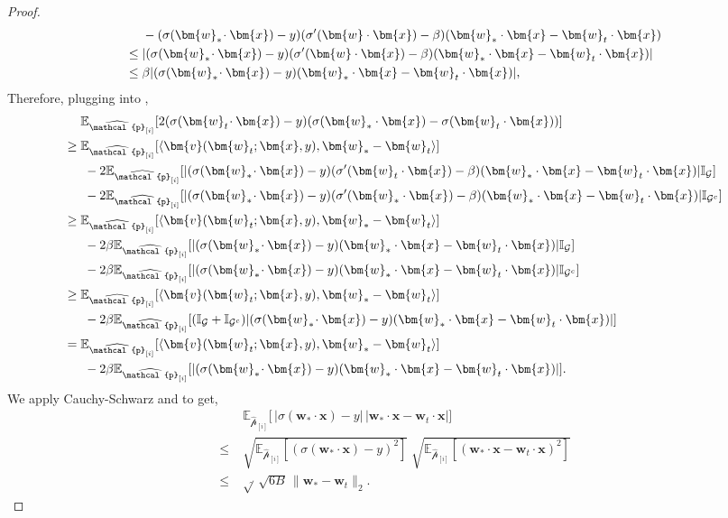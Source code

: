 \documentclass[11pt]{article}
\numberwithin{thm}{section}
\theoremstyle{plain}
\theoremstyle{definition}
\theoremstyle{remark} \newtheorem{remark}[thm]{Remark}
\def\vv{{\bm{v}}}
\def\vw{{\bm{w}}}
\def\vx{{\bm{x}}}
\def\ep{\widehat{\mathcal{p}}}
\def\cG{{\mathcal{G}}}
\newcommand{\E}{\mathbb{E}}
\newcommand{\Ind}{\mathbb{I}}
\newcommand{\innp}[1]{\langle #1 \rangle}
\DeclarePairedDelimiter\abs{|}{|}
\newcommand{\epi}{\ep_{[i]}}
\DeclareMathOperator{\mOPT}{OPT_m}
\newcommand{\mOPThat}{\widehat{\mOPT}}
\begin{document}
\begin{proof}
	\begin{align}\label{eq:bounding-two-terms}
		&-(\sigma(\vw_*\!\cdot\vx)-y)(\sigma'(\vw\cdot \vx)-\beta)(\vw_*\cdot \vx-\vw_t\cdot \vx) \notag \\
		\le\; & |(\sigma(\vw_*\!\cdot\vx)-y)(\sigma'(\vw\cdot \vx)-\beta)(\vw_*\cdot \vx-\vw_t\cdot \vx)| \notag \\
		\le \; & \beta|(\sigma(\vw_*\!\cdot\vx)-y)(\vw_*\cdot \vx-\vw_t\cdot \vx)|,
	\end{align}
	Therefore, plugging  into ,
	\begin{align*}
		& \E_{\epi}[2(\sigma(\vw_t\!\cdot\vx)-y)(\sigma(\vw_*\cdot \vx)-\sigma(\vw_t\cdot \vx))] \notag \\
		\ge \;  & \E_{\epi}[\innp{\vv(\vw_t;\vx,y), \vw_*-\vw_t}] \\
		&\;-  2\E_{\epi}[\abs{(\sigma(\vw_*\!\cdot\vx)-y)(\sigma'(\vw_t\cdot \vx)-\beta)(\vw_*\cdot \vx-\vw_t\cdot \vx)}\Ind_{\cG}] \\
		&\;- 2\E_{\epi}[\abs{(\sigma(\vw_*\!\cdot\vx)-y)(\sigma'(\vw_*\cdot \vx)-\beta)(\vw_*\cdot \vx-\vw_t\cdot \vx)}\Ind_{\cG^{c}}] \\
        \ge \;  & \E_{\epi}[\innp{\vv(\vw_t;\vx,y), \vw_*-\vw_t}] \\
		&\;- 2\beta\E_{\epi}[\abs{(\sigma(\vw_*\!\cdot\vx)-y)(\vw_*\cdot \vx-\vw_t\cdot \vx)}\Ind_{\cG}] \\
		&\;- 2\beta\E_{\epi}[\abs{(\sigma(\vw_*\!\cdot\vx)-y)(\vw_*\cdot \vx-\vw_t\cdot \vx)}\Ind_{\cG^{c}}] \\
		\ge \;  & \E_{\epi}[\innp{\vv(\vw_t;\vx,y), \vw_*-\vw_t}] \\
        & \;-  2\beta \E_{\epi}[(\Ind_\cG + \Ind_{\cG^c}) |(\sigma(\vw_*\!\cdot\vx)-y)(\vw_*\cdot \vx-\vw_t\cdot \vx)|]\\
		= \; &  \E_{\epi}[\innp{\vv(\vw_t;\vx,y), \vw_*-\vw_t}] \\
        &\; -  2\beta \E_{\epi}[|(\sigma(\vw_*\!\cdot\vx)-y)(\vw_*\cdot \vx-\vw_t\cdot \vx)|].
	\end{align*}
	We apply Cauchy-Schwarz and  to get,
	\begin{align*}		&\E_{\epi}\bigl[\,|\sigma(\vw_*\!\cdot\vx)-y|\,|\vw_*\!\cdot\vx-\vw_t\!\cdot\vx|\bigr] \\
		\le\;& 
		\sqrt{\E_{\epi}[(\sigma(\vw_*\!\cdot\vx)-y)^2]}\;\sqrt{\E_{\epi}[(\vw_*\!\cdot\vx-\vw_t\!\cdot\vx)^2]}\\
		\le\;& 
		\sqrt{\mOPThat}\,\sqrt{6B}\,\|\vw_*-\vw_t\|_2.

\end{align*}
\end{proof}
\end{document}
